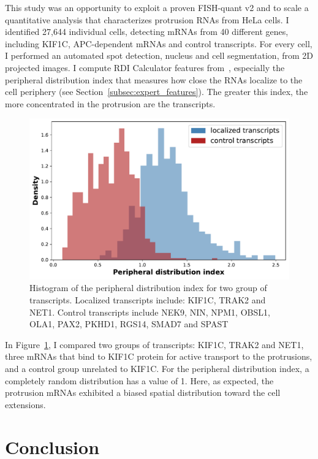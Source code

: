 This study was an opportunity to exploit a proven FISH-quant v2 and to scale a quantitative analysis that characterizes protrusion \ac{RNA}s from HeLa cells.
I identified 27,644 individual cells, detecting \ac{mRNA}s from 40 different genes, including KIF1C, APC-dependent \ac{mRNA}s and control transcripts.
For every cell, I performed an automated spot detection, nucleus and cell segmentation, from 2D projected images.
I compute RDI Calculator features from~\cite{stueland_rdi_2019}, especially the peripheral distribution index that measures how close the \ac{RNA}s localize to the cell periphery (see Section~\ref{subsec:expert_features}).
The greater this index, the more concentrated in the protrusion are the transcripts.

\begin{figure}[]
    \centering
    \includegraphics[width=\textwidth]{figures/chapter5/helacentrin_distribution_pdi}
    \caption[Histogram of the peripheral distribution index]{Histogram of the peripheral distribution index for two group of transcripts.
	Localized transcripts include: KIF1C, TRAK2 and NET1.
	Control transcripts include NEK9, NIN, NPM1, OBSL1, OLA1, PAX2, PKHD1, RGS14, SMAD7 and SPAST}
    \label{fig:xavier_pdi}
\end{figure}

In Figure~\ref{fig:xavier_pdi}, I compared two groups of transcripts: KIF1C, TRAK2 and NET1, three \ac{mRNA}s that bind to KIF1C protein for active transport to the protrusions, and a control group unrelated to KIF1C.
For the peripheral distribution index, a completely random distribution has a value of 1.
Here, as expected, the protrusion \ac{mRNA}s exhibited a biased spatial distribution toward the cell extensions.

\section{Conclusion}
\label{sec:conclusion_chapter5}

